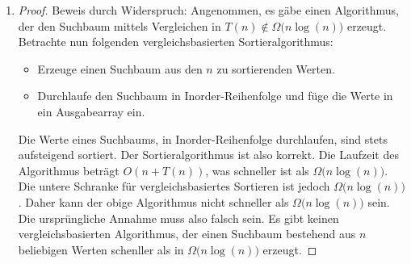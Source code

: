 \documentclass[11pt,a4paper]{article}
\begin{document}
\begin{loesung}
    \begin{enumerate}
        \item
        \begin{proof}
            Beweis durch Widerspruch:
            Angenommen, es gäbe einen Algorithmus, der den Suchbaum mittels Vergleichen in $T(n) \not\in \Omega\big(n \log(n)\big)$ erzeugt. 
            Betrachte nun folgenden vergleichsbasierten Sortieralgorithmus:
            \begin{itemize}
                \item Erzeuge einen Suchbaum aus den $n$ zu sortierenden Werten.
                \item Durchlaufe den Suchbaum in Inorder-Reihenfolge und füge die Werte in ein Ausgabearray ein.
            \end{itemize}
            Die Werte eines Suchbaums, in Inorder-Reihenfolge durchlaufen, sind stets aufsteigend sortiert.
            Der Sortieralgorithmus ist also korrekt.
            Die Laufzeit des Algorithmus beträgt $O(n + T(n))$, was schneller ist als $\Omega\big(n \log(n)\big)$.
            Die untere Schranke für vergleichsbasiertes Sortieren ist jedoch $\Omega\big(n \log(n)\big)$.
            Daher kann der obige Algorithmus nicht schneller als $\Omega\big(n \log(n)\big)$ sein.
            Die ursprüngliche Annahme muss also falsch sein.
            Es gibt keinen vergleichsbasierten Algorithmus, der einen Suchbaum bestehend aus $n$ beliebigen Werten schenller als in $\Omega\big(n \log(n)\big)$ erzeugt.
        \end{proof}


\end{enumerate}
\end{loesung}
\end{document}
